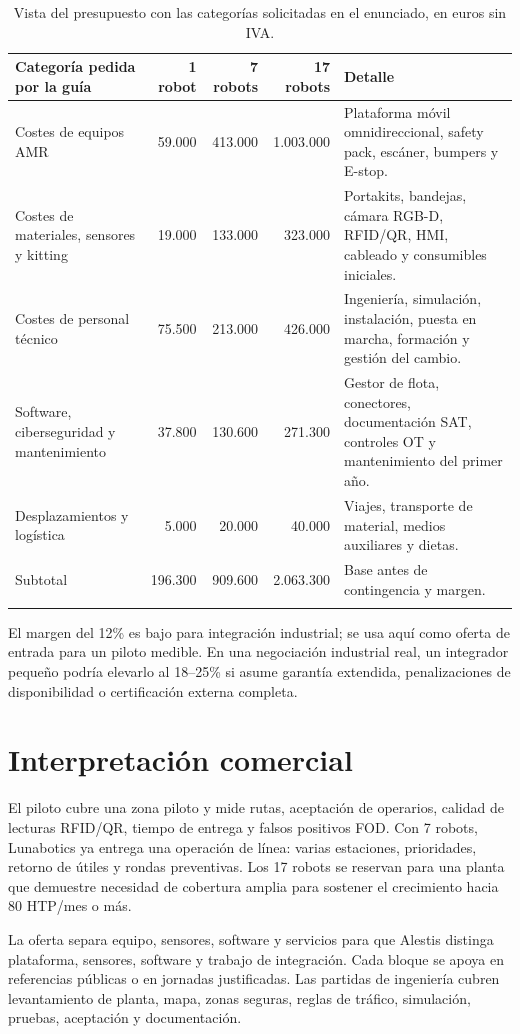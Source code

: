 \begin{longtable}{P{0.32\textwidth}r r r P{0.22\textwidth}}
\toprule
Categoría pedida por la guía & 1 robot & 7 robots & 17 robots & Detalle\\
\midrule
\endhead
Costes de equipos AMR & 59.000 & 413.000 & 1.003.000 & Plataforma móvil omnidireccional, safety pack, escáner, bumpers y E-stop.\\
Costes de materiales, sensores y kitting & 19.000 & 133.000 & 323.000 & Portakits, bandejas, cámara RGB-D, RFID/QR, HMI, cableado y consumibles iniciales.\\
Costes de personal técnico & 75.500 & 213.000 & 426.000 & Ingeniería, simulación, instalación, puesta en marcha, formación y gestión del cambio.\\
Software, ciberseguridad y mantenimiento & 37.800 & 130.600 & 271.300 & Gestor de flota, conectores, documentación SAT, controles OT y mantenimiento del primer año.\\
Desplazamientos y logística & 5.000 & 20.000 & 40.000 & Viajes, transporte de material, medios auxiliares y dietas.\\
\midrule
Subtotal & 196.300 & 909.600 & 2.063.300 & Base antes de contingencia y margen.\\
\bottomrule
\caption{Vista del presupuesto con las categorías solicitadas en el enunciado, en euros sin IVA.}
\label{tab:presupuesto-categorias-guia}
\end{longtable}

El margen del 12\% es bajo para integración industrial; se usa aquí como oferta de entrada para un piloto medible. En una negociación industrial real, un integrador pequeño podría elevarlo al 18--25\% si asume garantía extendida, penalizaciones de disponibilidad o certificación externa completa.

\section{Interpretación comercial}

El piloto cubre una zona piloto y mide rutas, aceptación de operarios, calidad de lecturas RFID/QR, tiempo de entrega y falsos positivos FOD. Con 7 robots, Lunabotics ya entrega una operación de línea: varias estaciones, prioridades, retorno de útiles y rondas preventivas. Los 17 robots se reservan para una planta que demuestre necesidad de cobertura amplia para sostener el crecimiento hacia 80 HTP/mes o más.

La oferta separa equipo, sensores, software y servicios para que Alestis distinga plataforma, sensores, software y trabajo de integración. Cada bloque se apoya en referencias públicas o en jornadas justificadas. Las partidas de ingeniería cubren levantamiento de planta, mapa, zonas seguras, reglas de tráfico, simulación, pruebas, aceptación y documentación.

